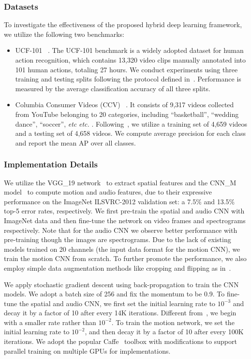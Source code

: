 \documentclass[journal]{IEEEtran}
\makeatletter
\newcommand*{\etc}{%
    \@ifnextchar{.}%
        {\emph{etc}}%
        {\emph{etc.}\@\xspace}%
}
\makeatother
\begin{document}
\subsubsection{Datasets}
To investigate the effectiveness of the proposed hybrid deep learning framework, we utilize the following two benchmarks:
\begin{itemize} 

\item{UCF-101} ~\cite{ucf101}. The UCF-101 benchmark is a widely adopted dataset for human action recognition, which contains 13,320 video clips manually annotated into 101 human actions, totaling 27 hours. We conduct experiments using three training and testing splits following the protocol defined in~\cite{THUMOS14}. Performance is measured by the average classification accuracy of all three splits.

\item{Columbia Consumer Videos (CCV)} ~\cite{icmr11:consumervideo}. It consists of 9,317 videos collected from YouTube belonging to 20 categories, including ``basketball'', ``wedding dance'', ``soccer'', \etc.  Following~\cite{icmr11:consumervideo}, we utilize a training set of 4,659 videos and a testing set of 4,658 videos. We compute average precision for each class and report the mean AP over all classes.

\end{itemize}

\subsubsection{Implementation Details}
We utilize the VGG\_19 network~\cite{Simonyan2015} to extract spatial features and the CNN\_M model~\cite{DBLP:conf/nips/SimonyanZ14} to compute motion and audio features, due to their expressive performance on the ImageNet ILSVRC-2012 validation set: a 7.5\% and 13.5\% top-5 error rates, respectively. We first pre-train the spatial and audio CNN with ImageNet data and then fine-tune the network on video frames and spectrograms respectively. Note that for the audio CNN we observe better performance with pre-training though the images are spectrograms. Due to the lack of existing models trained on 20 channels (the input data format for the motion CNN), we train the motion CNN from scratch. To further promote the performance, we also employ simple data augmentation methods like cropping and flipping as in~\cite{DBLP:conf/nips/SimonyanZ14}.

We apply stochastic gradient descent using back-propagation to train the CNN models. We adopt a batch size of 256 and fix the momentum to be 0.9. To fine-tune the spatial and audio CNN, we first set the initial learning rate to $10^{-3}$ and decay it by a factor of 10 after every 14K iterations. Different from~\cite{DBLP:conf/nips/SimonyanZ14}, we begin with a smaller rate rather than $10^{-2}$. To train the motion network, we set the initial learning rate to $10^{-2}$, and then decay it by a factor of 10 after every 100K iterations. We adopt the popular Caffe~\cite{jia2014caffe} toolbox with modifications to support parallel training on multiple GPUs for implementations.
\end{document}
